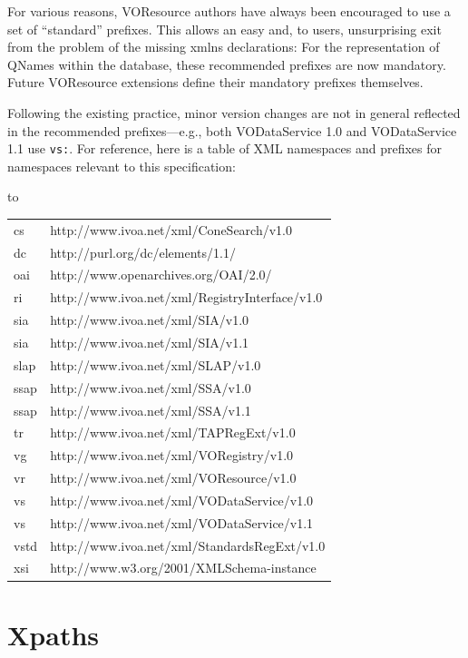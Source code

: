\documentclass[11pt,a4paper]{ivoa}
\newenvironment{inlinetable}{\vfil\penalty8000\vfilneg%
    \hbox to\hsize\bgroup\hss}
  {\hss\egroup\vspace{8pt}}
\begin{document}
For various reasons, VOResource authors have always been encouraged
to use a set of ``standard'' prefixes.  This allows an easy and, to users,
unsurprising exit from the problem of the missing xmlns declarations:
For the representation of QNames within the database, these recommended
prefixes are now mandatory. Future VOResource extensions define their
mandatory prefixes themselves.

Following the existing practice, minor version changes are not in
general reflected in the recommended prefixes—e.g., both VODataService
1.0 and VODataService 1.1 use \texttt{vs:}.  For reference, here is
a table of XML namespaces and prefixes for namespaces relevant to this
specification:


\begin{inlinetable}
\begin{tabular}{ll}
cs&http://www.ivoa.net/xml/ConeSearch/v1.0\\
dc&http://purl.org/dc/elements/1.1/\\
oai&http://www.openarchives.org/OAI/2.0/\\
ri&http://www.ivoa.net/xml/RegistryInterface/v1.0\\
sia&http://www.ivoa.net/xml/SIA/v1.0\\
sia&http://www.ivoa.net/xml/SIA/v1.1\\
slap&http://www.ivoa.net/xml/SLAP/v1.0\\
ssap&http://www.ivoa.net/xml/SSA/v1.0\\
ssap&http://www.ivoa.net/xml/SSA/v1.1\\
tr&http://www.ivoa.net/xml/TAPRegExt/v1.0\\
vg&http://www.ivoa.net/xml/VORegistry/v1.0\\
vr&http://www.ivoa.net/xml/VOResource/v1.0\\
vs&http://www.ivoa.net/xml/VODataService/v1.0\\
vs&http://www.ivoa.net/xml/VODataService/v1.1\\
vstd&http://www.ivoa.net/xml/StandardsRegExt/v1.0\\
xsi&http://www.w3.org/2001/XMLSchema-instance\\

\end{tabular}
\end{inlinetable}



\section{Xpaths}
\end{document}

